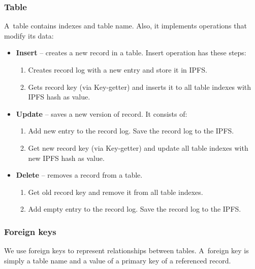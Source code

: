 \subsubsection{Table}
A~table contains indexes and table name. Also, it implements operations that modify its data:
\begin{itemize}
    \item \textbf{Insert} -- creates a new record in a table. Insert operation has these steps: 
        \begin{enumerate}
            \item Creates record log with a new entry and store it in IPFS.
            \item Gets record key (via Key-getter) and inserts it to all table indexes with IPFS hash as value.
        \end{enumerate}
    \item \textbf{Update} -- saves a new version of record. It consists of:
        \begin{enumerate}
            \item Add new entry to the record log. Save the record log to the IPFS.
            \item Get new record key (via Key-getter) and update all table indexes with new IPFS hash as value.
        \end{enumerate}
    \item \textbf{Delete} -- removes a record from a table. 
        \begin{enumerate}
            \item Get old record key and remove it from all table indexes.
            \item Add empty entry to the record log. Save the record log to the IPFS.
        \end{enumerate}
\end{itemize}

\subsubsection{Foreign keys}
We use foreign keys to represent relationships between tables. A~foreign key is simply a table name and a value of a primary key of a referenced record.

